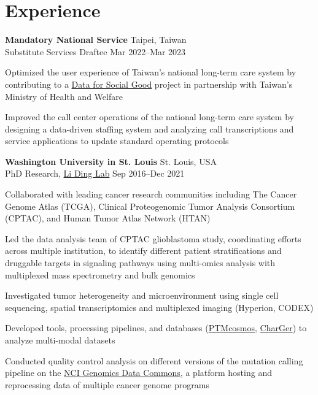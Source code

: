 \section{Experience}

\begin{entrylist}

\item \textbf{Mandatory National Service} \hfill Taipei, Taiwan\\
Substitute Services Draftee \hfill
Mar 2022--Mar 2023
\begin{detaillist}
    \item Optimized the user experience of Taiwan's national long-term care system by contributing to a \href{https://d4sg.org/}{Data for Social Good} project in partnership with Taiwan's Ministry of Health and Welfare
    \item Improved the call center operations of the national long-term care system by designing a data-driven staffing system and analyzing call transcriptions and service applications to update standard operating protocols
\end{detaillist}

\item \textbf{Washington University in St. Louis} \hfill St. Louis, USA\\
PhD Research, \href{https://dinglab.wustl.edu/}{Li Ding Lab} \hfill
Sep 2016--Dec 2021
\begin{detaillist}
    \item Collaborated with leading cancer research communities including The Cancer Genome Atlas (TCGA), Clinical Proteogenomic Tumor Analysis Consortium (CPTAC), and Human Tumor Atlas Network (HTAN)
    \item Led the data analysis team of CPTAC glioblastoma study, coordinating efforts across multiple institution, to identify different patient stratifications and druggable targets in signaling pathways using multi-omics analysis with multiplexed mass spectrometry and bulk genomics
    \item Investigated tumor heterogeneity and microenvironment using single cell sequencing, spatial transcriptomics and multiplexed imaging (Hyperion, CODEX)
    \item Developed tools, processing pipelines, and databases (\href{https://ptmcosmos.wustl.edu/}{PTMcosmos}, \href{https://github.com/ding-lab/CharGer}{CharGer}) to analyze multi-modal datasets
    \item Conducted quality control analysis on different versions of the mutation calling pipeline on the \href{https://gdc.cancer.gov/}{NCI Genomics Data Commons}, a platform hosting and reprocessing data of multiple cancer genome programs
\end{detaillist}


\end{entrylist}
